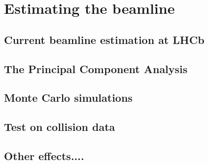 \chapter{Estimating the beamline}
\section{Current beamline estimation at LHCb}
\section{The Principal Component Analysis}
\section{Monte Carlo simulations}

\section{Test on collision data}

\section{Other effects....}

